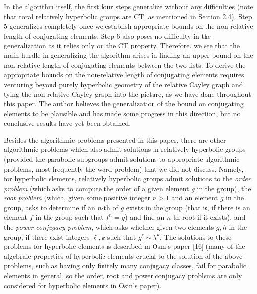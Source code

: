 \documentclass[12pt]{article}
\newcommand{\vs}{\vskip10pt}
\begin{document}
	In the algorithm itself, the first four steps generalize without any difficulties (note that toral relatively hyperbolic groups are CT, as mentioned in Section 2.4). Step 5 generalizes completely once we establish appropriate bounds on the non-relative length of conjugating elements. Step 6 also poses no difficulty in the generalization as it relies only on the CT property. Therefore, we see that the main hurdle in generalizing the algorithm arises in finding an upper bound on the non-relative length of conjugating elements between the two lists. To derive the appropriate bounds on the non-relative length of conjugating elements requires venturing beyond purely hyperbolic geometry of the relative Cayley graph and tying the non-relative Cayley graph into the picture, as we have done throughout this paper. The author believes the generalization of the bound on conjugating elements to be plausible and has made some progress in this direction, but no conclusive results have yet been obtained. 
	
	\vs
	
	Besides the algorithmic problems presented in this paper, there are other algorithmic problems which also admit solutions in relatively hyperbolic groups (provided the parabolic subgroups admit solutions to appropriate algorithmic problems, most frequently the word problem) that we did not discuss. Namely, for hyperbolic elements, relatively hyperbolic groups admit solutions to the \textit{order problem} (which asks to compute the order of a given element $g$ in the group), the \textit{root problem} (which, given some positive integer $n > 1$ and an element $g$ in the group, asks to determine if an $n$-th of $g$ exists in the group (that is, if there is an element $f$ in the group such that $f^n = g$) and find an $n$-th root if it exists), and the \textit{power conjugacy problem}, which asks whether given two elements $g,h$ in the group, if there exist integers $\ell, k$ such that $g^{\ell} \sim h^k$. The solutions to these problems for hyperbolic elements is described in Osin's paper [16] (many of the algebraic properties of hyperbolic elements crucial to the solution of the above problems, such as having only finitely many conjugacy classes, fail for parabolic elements in general, so the order, root and power conjugacy problems are only considered for hyperbolic elements in Osin's paper). 
	
	\vs 
	
\end{document}
